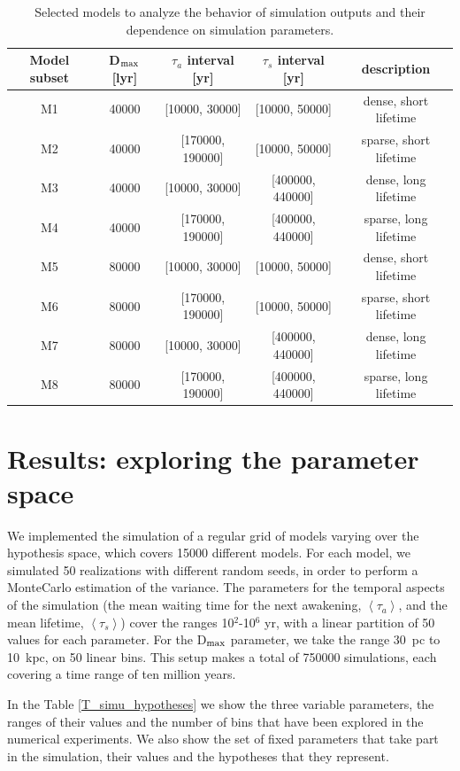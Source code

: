 \documentclass[crop]{CSLB}
\newcommand{\ttn}[1]{}
\begin{document}
\setlength{\tabcolsep}{10pt}
\begin{table}
\centering
\begin{tabular}{ccccc}
\hline
   Model subset & D$_{\rm max}$ [lyr] & $\tau_a$ interval [yr] & $\tau_s$ interval 
   [yr]& description  \\
\hline
M1 & 40000 & [10000, 30000]   & [10000, 50000]   &dense, short lifetime\\
M2 & 40000 & [170000, 190000] & [10000, 50000]   &sparse, short lifetime\\
M3 & 40000 & [10000, 30000]   & [400000, 440000] &dense, long lifetime \\
M4 & 40000 & [170000, 190000] & [400000, 440000] &sparse, long lifetime\\
%
M5 & 80000 & [10000, 30000]   & [10000, 50000]   &dense, short lifetime\\
M6 & 80000 & [170000, 190000] & [10000, 50000]   &sparse, short lifetime\\
M7 & 80000 & [10000, 30000]   & [400000, 440000] &dense, long lifetime \\
M8 & 80000 & [170000, 190000] & [400000, 440000] &sparse, long lifetime\\
%
\hline
\end{tabular}
\caption{Selected models to analyze the behavior of simulation outputs
   and their dependence on simulation parameters.}
\label{T_selected_models}
\end{table}

 


\section{Results: exploring the parameter space}\label{S_results}

We implemented the simulation of a regular grid of models varying over
the hypothesis space, which covers 15000 different models.
%
For each model, we simulated 50 realizations with different random
seeds, in order to perform a MonteCarlo estimation of the variance.
%
The parameters for the temporal aspects of the simulation (the mean
waiting time for the next awakening, $\left<\tau_a\right>$, and the
mean lifetime, $\left<\tau_s\right>$) cover the ranges 10$^2$-10$^6$
yr, with a linear partition of 50 values for each parameter.
%
For the D$_{\rm max}$ parameter, we take the range 30~pc to 10~kpc, on
50 linear bins.
%
This setup makes a total of 750000 simulations, each covering a time
range of ten million years.
%
\ttn{1}
%
In the Table \ref{T_simu_hypotheses} we show the three variable
parameters, the ranges of their values and the number of bins that
have been explored in the numerical experiments.
%
We also show the set of fixed parameters that take part in the simulation,
their values and the hypotheses that they represent.
\end{document}
